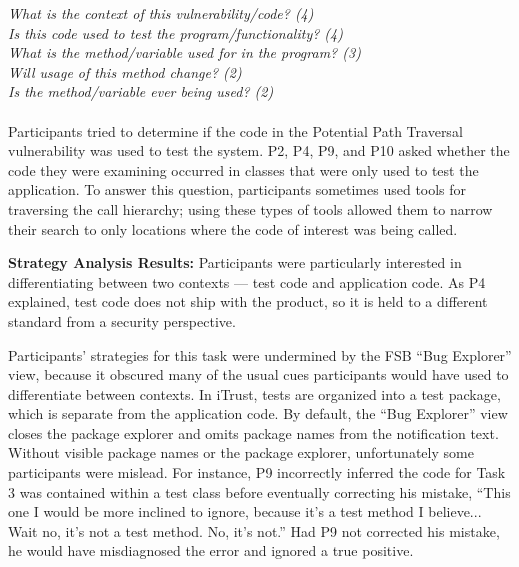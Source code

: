 \documentclass[10pt,journal,compsoc]{IEEEtran}
\begin{document}
\noindent\emph{What is the context of this vulnerability/code? (4)} \\
\emph{Is this code used to test the program/functionality? (4)} \\
\emph{What is the method/variable used for in the program? (3)} \\
\emph{Will usage of this method change? (2)} \\
\emph{Is the method/variable ever being used? (2)} \\
\\


Participants tried to determine if the code in the Potential Path Traversal vulnerability was used to test the system. 
P2, P4, P9, and P10 asked whether the code they were examining occurred in classes that were only used to test the application. 
To answer this question, participants sometimes used tools for traversing the call hierarchy; using these types of tools allowed them to narrow their search to only locations where the code of interest was being called.



\textbf{Strategy Analysis Results:}
Participants were particularly interested in differentiating between two contexts --- test code and application code. 
As P4 explained, test code does not ship with the product, so it is held to a different standard from a security perspective. 

Participants' strategies for this task were undermined by the FSB ``Bug Explorer'' view, because it obscured many of the usual cues participants would have used to differentiate between contexts.
In iTrust, tests are organized into a test package, which is separate from the application code. 
By default, the ``Bug Explorer'' view closes the package explorer and omits package names from the notification text.
Without visible package names or the package explorer, unfortunately some participants were mislead.
For instance, P9 incorrectly inferred the code for Task 3 was contained within a test class before eventually correcting his mistake, 
``This one I would be more inclined to ignore, because it's a test method I believe... Wait no, it's not a test method. No, it's not.''
Had P9 not corrected his mistake, he would have misdiagnosed the error and ignored a true positive.
\end{document}
